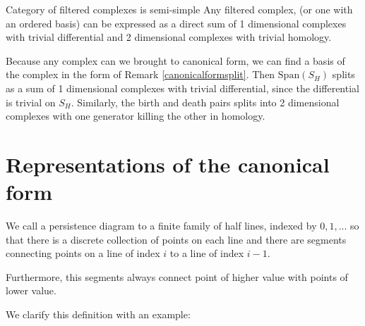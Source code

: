 \begin{corollary}{Category of filtered complexes is semi-simple}
Any filtered complex, (or one with an ordered basis) can be expressed as a direct sum of 
1 dimensional complexes with trivial differential and 2 dimensional complexes with trivial homology.
\end{corollary}

\begin{prof}
Because any complex can we brought to canonical form, we can find a basis of the complex in the form of Remark \ref{canonicalformsplit}.
Then $\text{Span}(S_H)$ splits as a sum of 1 dimensional complexes with trivial differential, since the differential is trivial on $S_H$.
Similarly, the birth and death pairs splits into 2 dimensional complexes with one generator killing the other in homology.

\end{prof}

\section{Representations of the canonical form}

\begin{definition}
We call a persistence diagram to a finite family of half lines, indexed by $0,1,...$
so that there is a discrete collection of points on each line and there are segments connecting points
on a line of index $i$ to a line of index $i-1$.

Furthermore, this segments always connect point of higher value with points of lower value.
\end{definition}

We clarify this definition with an example:

